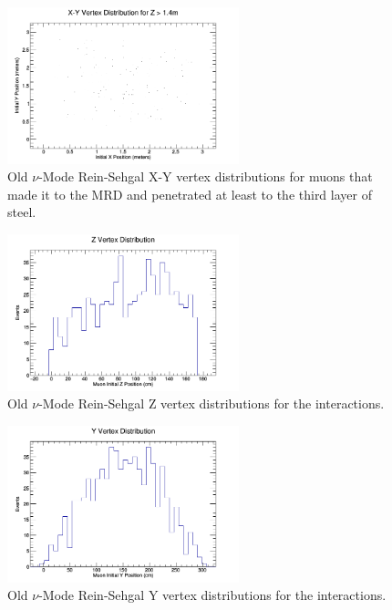 \documentclass[11pt]{article}
\begin{document}
\begin{figure}[H]
\centering
\includegraphics[width=0.6\textwidth]{OldNMReinSehgalImages/1-X-YVertexDistributionNMORS.png}
\caption{Old $\nu$-Mode Rein-Sehgal X-Y vertex distributions for muons that made it to the MRD and penetrated at least to the third layer of steel.}
\end{figure}

\begin{figure}[H]
\centering
\includegraphics[width=0.6\textwidth]{OldNMReinSehgalImages/2-ZVertexDistributionNMORS.png}
\caption{Old $\nu$-Mode Rein-Sehgal Z vertex distributions for the interactions.}
\end{figure}

\begin{figure}[H]
\centering
\includegraphics[width=0.6\textwidth]{OldNMReinSehgalImages/3-YVertexDistributionNMORS.png}
\caption{Old $\nu$-Mode Rein-Sehgal Y vertex distributions for the interactions.}
\end{figure}
\end{document}
